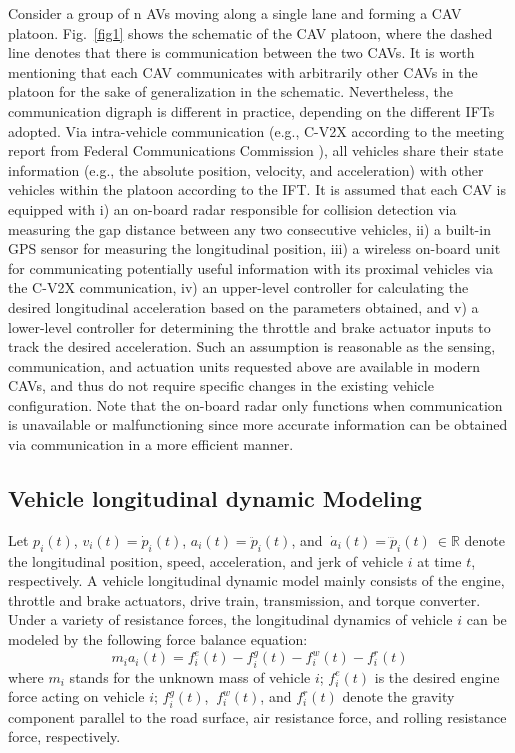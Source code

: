 \documentclass[a4paper]{cas-sc}
\begin{document}
Consider a group of n AVs moving along a single lane and forming a CAV platoon. Fig.~\ref{fig1} shows the schematic of the CAV platoon, where the dashed line denotes that there is communication between the two CAVs. It is worth mentioning that each CAV communicates with arbitrarily other CAVs in the platoon for the sake of generalization in the schematic. Nevertheless, the communication digraph is different in practice, depending on the different IFTs adopted. Via intra-vehicle communication (e.g., C-V2X according to the meeting report from Federal Communications Commission \citep{VerizonNorth2020}), all vehicles share their state information (e.g., the absolute position, velocity, and acceleration) with other vehicles within the platoon according to the IFT. It is assumed that each CAV is equipped with i) an on-board radar responsible for collision detection via measuring the gap distance between any two consecutive vehicles, ii) a built-in GPS sensor for measuring the longitudinal position, iii) a wireless on-board unit for communicating potentially useful information with its proximal vehicles via the C-V2X communication, iv) an upper-level controller for calculating the desired longitudinal acceleration based on the parameters obtained, and v) a lower-level controller for determining the throttle and brake actuator inputs to track the desired acceleration. Such an assumption is reasonable as the sensing, communication, and actuation units requested above are available in modern CAVs, and thus do not require specific changes in the existing vehicle configuration. Note that the on-board radar only functions when communication is unavailable or malfunctioning since more accurate information can be obtained via communication in a more efficient manner.

\subsection{Vehicle longitudinal dynamic Modeling}
\label{Section 3.1}

Let $p_i\left(t\right)$, $v_i\left(t\right)={\dot{p}}_i\left(t\right)$, $a_i\left(t\right)={\ddot{p}}_i\left(t\right)$, and $\ {\dot{a}}_i\left(t\right)={\dddot{p}}_i\left(t\right)\ \in\mathbb{R}$ denote the longitudinal position, speed, acceleration, and jerk of vehicle $i$ at time $t$, respectively. A vehicle longitudinal dynamic model mainly consists of the engine, throttle and brake actuators, drive train, transmission, and torque converter. Under a variety of resistance forces, the longitudinal dynamics of vehicle $i$ can be modeled by the following force balance equation:
\begin{equation}
  m_ia_i(t)=f_i^e(t)-f_i^g(t)-f_i^w(t)-f_i^r(t)
  \label{eq2}
\end{equation}
where $m_i$ stands for the unknown mass of vehicle $i$; $f_i^e(t)$ is the desired engine force acting on vehicle $i$; $f_i^g(t)$, $\ f_i^w(t)$, and $f_i^r(t)$ denote the gravity component parallel to the road surface, air resistance force, and rolling resistance force, respectively.
\end{document}

